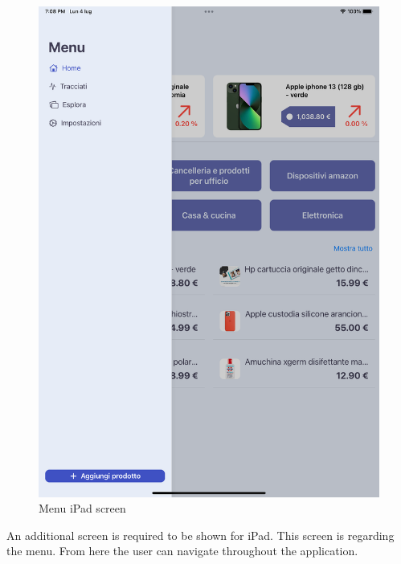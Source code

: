 \begin{figure}[h!]
        \centering
        \includegraphics[scale=0.15]{images/interfaces/menu_ipad.png}
        \caption{Menu iPad screen}
        \label{fig:menu_ipad}
\end{figure}
\FloatBarrier
An additional screen is required to be shown for iPad. This screen is regarding the menu. From here the user can navigate throughout the application.



\newpage
